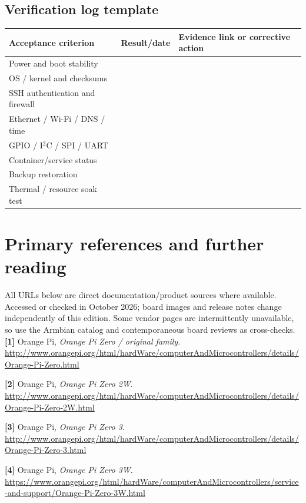 \documentclass[10pt,oneside,openany]{report}
\begin{document}
\section{Verification log template}
\begin{center}\small\begin{tabularx}{\textwidth}{@{}p{4.0cm}p{2.5cm}X@{}}\toprule
\textbf{Acceptance criterion} & \textbf{Result/date} & \textbf{Evidence link or corrective action}\\\midrule
Power and boot stability & & \\[1.1ex]
OS / kernel and checksums & & \\[1.1ex]
SSH authentication and firewall & & \\[1.1ex]
Ethernet / Wi-Fi / DNS / time & & \\[1.1ex]
GPIO / I\(^{2}\)C / SPI / UART & & \\[1.1ex]
Container/service status & & \\[1.1ex]
Backup restoration & & \\[1.1ex]
Thermal / resource soak test & & \\[1.1ex]
\bottomrule\end{tabularx}\end{center}

\chapter{Primary references and further reading}
\noindent All URLs below are direct documentation/product sources where available. Accessed or checked in October 2026; board images and release notes change independently of this edition. Some vendor pages are intermittently unavailable, so use the Armbian catalog and contemporaneous board reviews as cross-checks.
\begingroup\footnotesize\setlength{\parskip}{2pt}
\noindent\textbf{[1]} Orange Pi, \emph{Orange Pi Zero / original family}. \url{http://www.orangepi.org/html/hardWare/computerAndMicrocontrollers/details/Orange-Pi-Zero.html}

\noindent\textbf{[2]} Orange Pi, \emph{Orange Pi Zero 2W}. \url{http://www.orangepi.org/html/hardWare/computerAndMicrocontrollers/details/Orange-Pi-Zero-2W.html}

\noindent\textbf{[3]} Orange Pi, \emph{Orange Pi Zero 3}. \url{http://www.orangepi.org/html/hardWare/computerAndMicrocontrollers/details/Orange-Pi-Zero-3.html}

\noindent\textbf{[4]} Orange Pi, \emph{Orange Pi Zero 3W}. \url{https://www.orangepi.org/html/hardWare/computerAndMicrocontrollers/service-and-support/Orange-Pi-Zero-3W.html}
\end{document}
